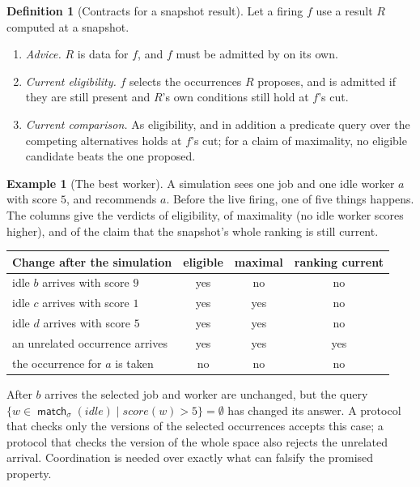 \documentclass[11pt]{article}
\theoremstyle{plain}
\theoremstyle{definition}
\newtheorem{definition}[theorem]{Definition}
\newtheorem{example}[theorem]{Example}
\theoremstyle{remark}
\newcommand{\op}[1]{\operatorname{\mathsf{#1}}}
\begin{document}
\begin{definition}[Contracts for a snapshot result]\label{def:contracts}
Let a firing $f$ use a result $R$ computed at a snapshot.
\begin{enumerate}
\item \emph{Advice.} $R$ is data for $f$, and $f$ must be admitted by  on its own.
\item \emph{Current eligibility.} $f$ selects the occurrences $R$ proposes, and is admitted if
  they are still present and $R$'s own conditions still hold at $f$'s cut.
\item \emph{Current comparison.} As eligibility, and in addition a predicate query over the
  competing alternatives holds at $f$'s cut; for a claim of maximality, no eligible candidate
  beats the one proposed.
\end{enumerate}
\end{definition}

\begin{example}[The best worker]\label{ex:best}
A simulation sees one job and one idle worker $a$ with score $5$, and recommends $a$. Before the
live firing, one of five things happens. The columns give the verdicts of eligibility, of
maximality (no idle worker scores higher), and of the claim that the snapshot's whole ranking is
still current.
\begin{center}\small
\begin{tabular}{@{}lccc@{}}
\toprule
Change after the simulation & eligible & maximal & ranking current \\
\midrule
idle $b$ arrives with score $9$ & yes & no & no \\
idle $c$ arrives with score $1$ & yes & yes & no \\
idle $d$ arrives with score $5$ & yes & yes & no \\
an unrelated occurrence arrives & yes & yes & yes \\
the occurrence for $a$ is taken & no & no & no \\
\bottomrule
\end{tabular}
\end{center}
After $b$ arrives the selected job and worker are unchanged, but the query
$\{w\in\op{match}_\sigma(\mathit{idle})\mid \mathit{score}(w)>5\}=\emptyset$ has changed its
answer. A protocol that checks only the versions of the selected occurrences accepts this case; a
protocol that checks the version of the whole space also rejects the unrelated arrival.
Coordination is needed over exactly what can falsify the promised property.
\end{example}
\end{document}
